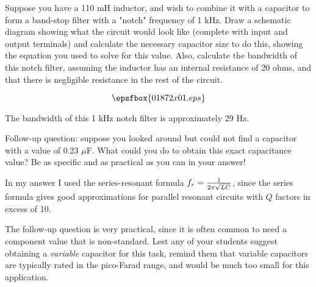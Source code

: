 

Suppose you have a 110 mH inductor, and wish to combine it with a capacitor to form a band-stop filter with a "notch" frequency of 1 kHz.  Draw a schematic diagram showing what the circuit would look like (complete with input and output terminals) and calculate the necessary capacitor size to do this, showing the equation you used to solve for this value.  Also, calculate the bandwidth of this notch filter, assuming the inductor has an internal resistance of 20 ohms, and that there is negligible resistance in the rest of the circuit.







$$\epsfbox{01872x01.eps}$$

The bandwidth of this 1 kHz notch filter is approximately 29 Hz.

\vskip 10pt

Follow-up question: suppose you looked around but could not find a capacitor with a value of 0.23 $\mu$F.  What could you do to obtain this exact capacitance value?  Be as specific and as practical as you can in your answer!







In my answer I used the series-resonant formula $f_r = {1 \over {2 \pi \sqrt{LC}}}$, since the series formula gives good approximations for parallel resonant circuits with $Q$ factors in excess of 10.

The follow-up question is very practical, since it is often common to need a component value that is non-standard.  Lest any of your students suggest obtaining a {\it variable} capacitor for this task, remind them that variable capacitors are typically rated in the pico-Farad range, and would be much too small for this application.




